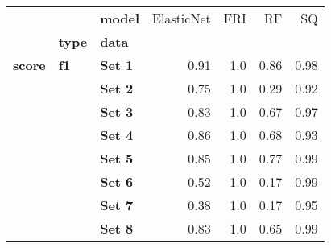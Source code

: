 \begin{tabular}{lllrrrr}
\toprule
      &    & \textbf{model} &  ElasticNet &  FRI &    RF &    SQ \\
{} & \textbf{type} & \textbf{data} &             &      &       &       \\
\midrule
\textbf{score} & \textbf{f1} & \textbf{Set 1} &        0.91 &  1.0 &  0.86 &  0.98 \\
      &    & \textbf{Set 2} &        0.75 &  1.0 &  0.29 &  0.92 \\
      &    & \textbf{Set 3} &        0.83 &  1.0 &  0.67 &  0.97 \\
      &    & \textbf{Set 4} &        0.86 &  1.0 &  0.68 &  0.93 \\
      &    & \textbf{Set 5} &        0.85 &  1.0 &  0.77 &  0.99 \\
      &    & \textbf{Set 6} &        0.52 &  1.0 &  0.17 &  0.99 \\
      &    & \textbf{Set 7} &        0.38 &  1.0 &  0.17 &  0.95 \\
      &    & \textbf{Set 8} &        0.83 &  1.0 &  0.65 &  0.99 \\
\bottomrule
\end{tabular}
